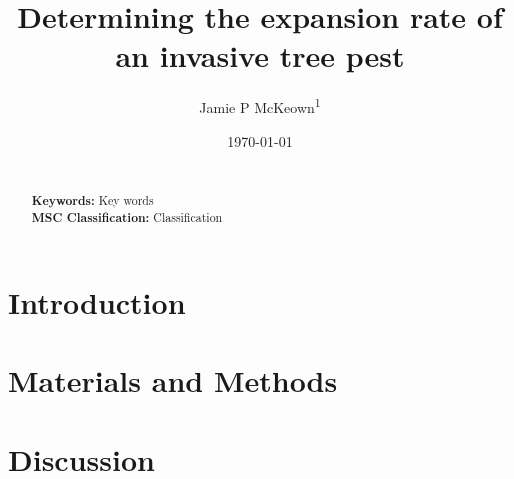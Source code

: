 \documentclass[9pt, reqno]{amsart}
\numberwithin{equation}{section}
\renewcommand{\(}{\left(}
\renewcommand{\)}{\right)}
\theoremstyle{definition}
\theoremstyle{definition}
\theoremstyle{definition}
\newcommand{\draft}[1]{\textcolor{draftcol}{#1}}
\begin{document}
\title{Determining the expansion rate of an invasive tree pest}

\author[JP McKeown]{Jamie P McKeown\textsuperscript{1}}
\address[A1]{School of Mathematics, Statistics, and Physics, Newcastle University, Newcastle upon Tyne, UK.}

\date{\today}
\maketitle 

\begin{abstract}
\centering \bigskip
\begin{minipage}{\dimexpr\paperwidth-10cm}
\draft{\lipsum[1]}  \\

\bigskip
\noindent\textbf{Keywords:} \draft{Key words}\\

\bigskip
\noindent\textbf{MSC Classification:} \draft{Classification} \\	
\end{minipage} 
\end{abstract} 


\section{Introduction}\label{sec:introduction}

\section{Materials and Methods}\label{sec:methods}
	

	



\section{Discussion}\label{sec:discussion}





\def\bibcommenthead{}%



\appendix
\end{document}
